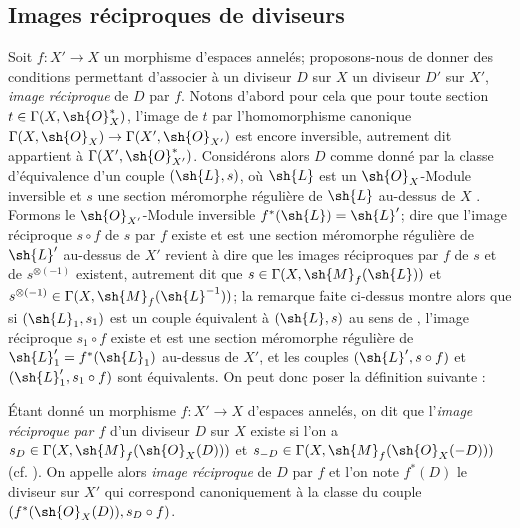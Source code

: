 \subsection{Images réciproques de diviseurs}
\label{subsection:IV.21.4}
\label{IV.21.4}

\begin{env}[21.4.1]
\label{IV.21.4.1}
Soit $f:X'\to X$ un morphisme d'espaces annelés;
proposons-nous de donner des conditions permettant d'associer à un diviseur $D$ sur $X$ un diviseur $D'$ sur $X'$, \emph{image réciproque} de $D$ par $f$.
Notons d'abord pour cela que pour toute section $t\in\Gamma(X,\sh{O}_X^*)$, l'image de $t$ par l'homomorphisme canonique $\Gamma(X,\sh{O}_X)\to\Gamma(X',\sh{O}_{X'})$ est encore inversible, autrement dit appartient à $\Gamma(X',\sh{O}_{X'}^*)$.
Considérons alors $D$ comme donné par la classe d'équivalence d'un couple $(\sh{L},s)$, où $\sh{L}$ est un $\sh{O}_X$-Module inversible et $s$ une section méromorphe régulière de $\sh{L}$ au-dessus de $X$ .
Formons le $\sh{O}_{X'}$-Module inversible $f^*(\sh{L})=\sh{L}'$;
dire que l'image réciproque $s\circ f$ de $s$ par $f$ existe  et est une section méromorphe régulière de $\sh{L}'$ au-dessus de $X'$ revient à dire que les images réciproques par $f$ de $s$ et de $s^{\otimes(-1)}$ existent, autrement dit que $s\in\Gamma(X,\sh{M}_f(\sh{L}))$ et $s^{\otimes(-1)}\in\Gamma(X,\sh{M}_f(\sh{L}^{-1}))$;
la remarque faite ci-dessus montre alors que si $(\sh{L}_1,s_1)$ est un couple équivalent à $(\sh{L},s)$ au sens de , l'image réciproque $s_1\circ f$ existe et est une section méromorphe régulière de $\sh{L}_1'=f^*(\sh{L}_1)$ au-dessus de $X'$, et les couples $(\sh{L}',s\circ f)$ et $(\sh{L}_1',s_1\circ f)$ sont équivalents.
On peut donc poser la définition suivante :
\end{env}

\begin{definition}[21.4.2]
\label{IV.21.4.2}
Étant donné un morphisme $f:X'\to X$ d'espaces annelés, on dit que l'\emph{image réciproque par $f$} d'un diviseur $D$ sur $X$ existe si l'on a $s_D\in\Gamma(X,\sh{M}_f(\sh{O}_X(D)))$ et $s_{-D}\in\Gamma(X,\sh{M}_f(\sh{O}_X(-D)))$ (cf. ).
On appelle alors \emph{image réciproque} de $D$ par $f$ et l'on note $f^*(D)$ le diviseur sur $X'$ qui correspond canoniquement  à la classe du couple $(f^*(\sh{O}_X(D)),s_D\circ f)$.
\end{definition}

